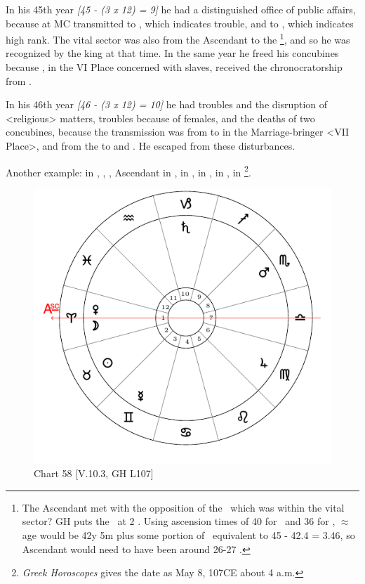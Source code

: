 In his 45th year \textsl{[45 - (3 x 12) = 9]} he had a distinguished office of public affairs, because \Venus\xspace at MC transmitted to \Mars, which indicates trouble, and to \Jupiter, which indicates high rank. The vital sector was also from the Ascendant to the \Sun\footnote{The Ascendant met with the opposition of the \Sun\, which was within the vital sector? GH puts the \Sun\, at 2 \Taurus. Using ascension times of 40 for \Libra\, and 36 for \Scorpio, $\approx$ age would be 42y 5m plus some portion of \Virgo\, equivalent to 45 - 42.4 = 3.46, so Ascendant would need to have been around 26-27 \Virgo.}, and so he was recognized by the king at that time. In the same year he freed his concubines because \Jupiter, in the VI Place concerned with slaves, received the chronocratorship from \Venus. 

In his 46th year \textsl{[46 - (3 x 12) = 10]} he had troubles and the disruption of <religious> matters, troubles because of females, and the deaths of two concubines, because the transmission was from \Venus\xspace to \Saturn\xspace in the Marriage-bringer <VII Place>, and from the \Sun\xspace to \Mars\xspace and \Jupiter. He escaped from these disturbances.

\newpage
Another example: \Sun\xspace in \Taurus, \Moon, \Venus, Ascendant in \Aries, \Saturn\xspace in \Capricorn, \Jupiter\xspace in \Virgo, \Mars\xspace in \Scorpio, \Mercury\xspace in \Gemini\footnote{\textit{Greek Horoscopes} gives the date as May 8, 107CE about 4 a.m.}. 

\begin{figure}
\centering
\vspace{-20pt}
\includegraphics[width=.68\textwidth]{charts/5_10_03}
\caption{Chart 58 [V.10.3, GH L107]}
\label{fig:chart58}
\end{figure}


